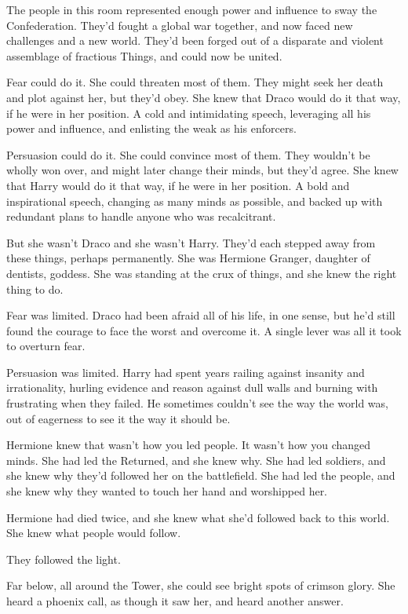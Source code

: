 The people in this room represented enough power and influence to sway
the Confederation. They'd fought a global war together, and now faced
new challenges and a new world. They'd been forged out of a disparate
and violent assemblage of fractious Things, and could now be united.

Fear could do it. She could threaten most of them. They might seek her
death and plot against her, but they'd obey. She knew that Draco would
do it that way, if he were in her position. A cold and intimidating
speech, leveraging all his power and influence, and enlisting the weak
as his enforcers.

Persuasion could do it. She could convince most of them. They wouldn't
be wholly won over, and might later change their minds, but they'd
agree. She knew that Harry would do it that way, if he were in her
position. A bold and inspirational speech, changing as many minds as
possible, and backed up with redundant plans to handle anyone who was
recalcitrant.

But she wasn't Draco and she wasn't Harry. They'd each stepped away from
these things, perhaps permanently. She was Hermione Granger, daughter of
dentists, goddess. She was standing at the crux of things, and she knew
the right thing to do.

Fear was limited. Draco had been afraid all of his life, in one sense,
but he'd still found the courage to face the worst and overcome it. A
single lever was all it took to overturn fear.

Persuasion was limited. Harry had spent years railing against insanity
and irrationality, hurling evidence and reason against dull walls and
burning with frustrating when they failed. He sometimes couldn't see the
way the world was, out of eagerness to see it the way it should be.

Hermione knew that wasn't how you led people. It wasn't how you changed
minds. She had led the Returned, and she knew why. She had led soldiers,
and she knew why they'd followed her on the battlefield. She had led the
people, and she knew why they wanted to touch her hand and worshipped
her.

Hermione had died twice, and she knew what she'd followed back to this
world. She knew what people would follow.

They followed the light.

Far below, all around the Tower, she could see bright spots of crimson
glory. She heard a phoenix call, as though it saw her, and heard another
answer.

